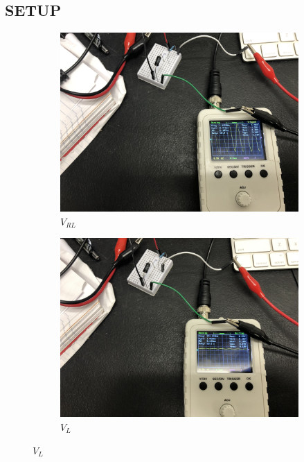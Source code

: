 \documentclass{article}
\def\F#1{\(#1\)}
\begin{document}
\begin{center}
  \subsection*{SETUP}
  \begin{figure}[!htp]
    \begin{subfigure}{0.5\textwidth}
    \includegraphics[scale=0.061]{V_RL.jpeg}
    \caption*{\F{V_{RL}}}\label{fig:subim1}
    \end{subfigure}
    \begin{subfigure}{0.5\textwidth}
    \includegraphics[scale=0.061]{V_L.jpeg}
    \caption*{\F{V_{L}}}\label{fig:subim2}
    \end{subfigure}
  \end{figure}

\end{center}
\end{document}
